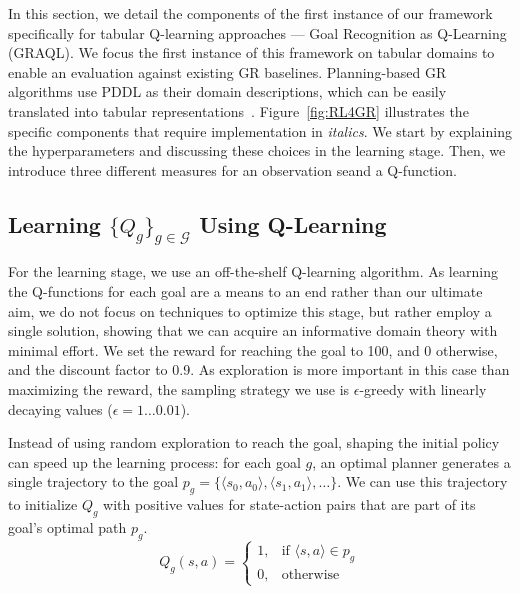 \documentclass[letterpaper]{article}
\providecommand\goals{\mathcal{G}}
\begin{document}
In this section, we detail the components of the first instance of our framework specifically for tabular Q-learning approaches --- Goal Recognition as Q-Learning (GRAQL).
We focus the first instance of this framework on tabular domains to enable an evaluation against existing GR baselines. Planning-based GR algorithms use PDDL as their domain descriptions, which can be easily translated into tabular representations~\cite{ramirez2009plan,amado2018goal}.
Figure~\ref{fig:RL4GR} illustrates the specific components that require implementation in \textit{italics}.
We start by explaining the hyperparameters and discussing these choices in the learning stage.
Then, we introduce three different measures for an observation seand a Q-function.

\subsection{Learning $\{Q_g\}_{g\in \goals}$ Using Q-Learning}
For the learning stage, we use an off-the-shelf Q-learning algorithm.
As learning the Q-functions for each goal are a means to an end rather than our ultimate aim, we do not focus on techniques to optimize this stage, but rather employ a single solution, showing that we can acquire an informative domain theory with minimal effort.
We set the reward for reaching the goal to 100, and 0 otherwise, and the discount factor to 0.9.
As exploration is more important in this case than maximizing the reward, the sampling strategy we use is $\epsilon$-greedy with linearly decaying values ($\epsilon = 1 \ldots 0.01$).

Instead of using random exploration to reach the goal, shaping the initial policy can speed up the learning process: for each goal $g$, an optimal planner generates a single trajectory to the goal $p_g = \{\langle s_0, a_0 \rangle, \langle s_1, a_1 \rangle, \ldots \}$.
We can use this trajectory to initialize $Q_g$ with positive values for state-action pairs that are part of its goal's optimal path $p_g$.
%
\begin{equation}
    Q_g(s,a) =
    \begin{cases}
    1,& \text{if } \langle s,a \rangle \in p_g \\
    0,              & \text{otherwise}
\end{cases}
\end{equation}
\end{document}

